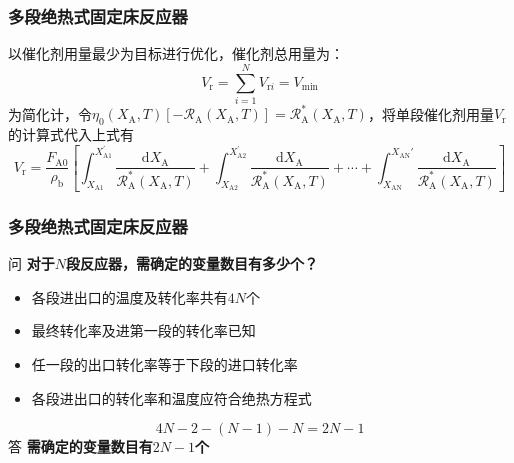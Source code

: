\begin{frame}
    \frametitle{多段绝热式固定床反应器}

    以催化剂用量最少为目标进行优化，催化剂总用量为：
    \[
        V_{\mathrm{r}}=\sum_{i=1}^{N} V_{\mathrm{r} i}=V_{\min }
    \]
    为简化计，令$\eta_0 (X_{\mathrm{A}}, T)[-\mathscr{R}_{\mathrm{A}}(X_{\mathrm{A}}, T)] = \mathscr{R}_{\mathrm{A}}^{*}(X_{\mathrm{A}}, T)$，将单段催化剂用量$V_\mathrm{r}$的计算式代入上式有
    \[
        V_{\mathrm{r}}=\frac{F_{\mathrm{A} 0}}{\rho_{\mathrm{b}}}\left[\int_{X_{\mathrm{A} 1}}^{X_{\mathrm{A} 1}^{\prime}} \frac{\mathrm{d} X_{\mathrm{A}}}{\mathscr{R}_{\mathrm{A}}^{*}(X_{\mathrm{A}}, T)}+\int_{X_{\mathrm{A} 2}}^{X_{\mathrm{A2}}^{\prime}} \frac{\mathrm{d} X_{\mathrm{A}}}{\mathscr{R}_{\mathrm{A}}^{*}(X_{\mathrm{A}}, T)}+\cdots+\int_{X_{\mathrm{AN}}}^{X_{\mathrm{AN}}'} \frac{\mathrm{d} X_{\mathrm{A}}}{\mathscr{R}_{\mathrm{A}}^{*}(X_{\mathrm{A}}, T)}\right]
    \]
    
    

\end{frame}


\begin{frame}
    \frametitle{多段绝热式固定床反应器}

    
    \highlight 问 \bf{对于$N$段反应器，需确定的变量数目有多少个？}
    \bigskip

        \begin{minipage}{0.08\linewidth}
            
        \end{minipage}\hfill
        \begin{minipage}{0.88\linewidth}
            \begin{itemize}
                \item[$4N$] 各段进出口的温度及转化率共有$4N$个
                \item[$-2$] 最终转化率及进第一段的转化率已知
                \item[$-(N-1)$] 任一段的出口转化率等于下段的进口转化率
                \item[$-N$] 各段进出口的转化率和温度应符合绝热方程式
            \end{itemize}
        \end{minipage} 
        
    \[
        4N-2-(N-1)-N = 2N-1
    \]
    \highlight 答 \bf{需确定的变量数目有$2N-1$个}

\end{frame}


